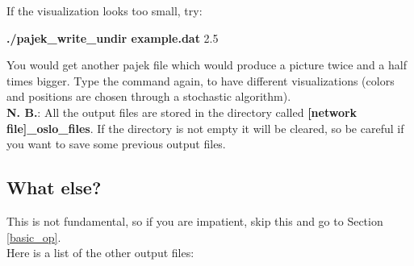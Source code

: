 \documentclass[11pt]{article}
\begin{document}
If the visualization looks too small, try:

{ \textbf{./pajek\_write\_undir example.dat} 2.5 }

You would get another pajek file which would produce a picture twice
and a half times bigger. Type the command again, 
to have different visualizations (colors and positions are chosen through a stochastic algorithm).
\\


\textbf{N. B.}: All the output files are stored in the directory called
\textbf{[network file]\_oslo\_files}. 
If the directory is not empty it will be cleared, so be careful if you want to save some previous output files.

\subsection{What else?}

This is not fundamental, so if you are impatient, skip this and go to Section \ref{basic_op}.
\\

 Here is a list of the other output files:
\end{document}
